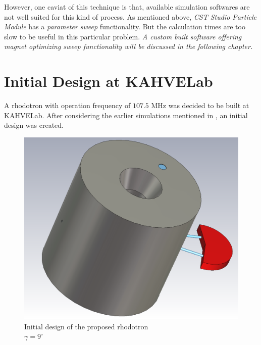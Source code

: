 \documentclass[a4paper,oneside,12pt]{report}
\numberwithin{equation}{chapter}
\begin{document}
However, one caviat of this technique is that, available simulation softwares are not well suited for this kind of process. As mentioned above, \textit{CST Studio Particle Module} has a \textit{parameter sweep} functionality.
But the calculation times are too slow to be useful in this particular problem. \textit{A custom built software offering magnet optimizing sweep functionality will be discussed in the following chapter.}



\newpage



\section{Initial Design at KAHVELab} 

A rhodotron with operation frequency of $107.5$ MHz was decided to be built at KAHVELab. 
After considering the earlier simulations mentioned in , an initial design was created.
\begin{figure}[H]
    \centering
    \captionsetup{justification=centering}
    \includegraphics[width=.5\linewidth]{./figures/cst/cst_first_design1.png}
    \caption{Initial design of the proposed rhodotron \\ $\gamma=9^\circ$}
    \label{fig:initial_design}
\end{figure}
\end{document}
